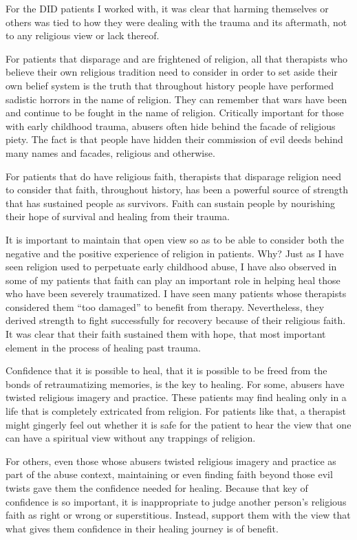 \documentclass[]{book}
\begin{document}
For the DID patients I worked with, it was clear that harming themselves or others was tied to how they were dealing with the trauma and its aftermath, not to any religious view or lack thereof.

For patients that disparage and are frightened of religion, all that therapists who believe their own religious tradition need to consider in order to set aside their own belief system is the truth that throughout history people have performed sadistic horrors in the name of religion. They can remember that wars have been and continue to be fought in the name of religion. Critically important for those with early childhood trauma, abusers often hide behind the facade of religious piety. The fact is that people have hidden their commission of evil deeds behind many names and facades, religious and otherwise.

For patients that do have religious faith, therapists that disparage religion need to consider that faith, throughout history, has been a powerful source of strength that has sustained people as survivors. Faith can sustain people by nourishing their hope of survival and healing from their trauma.

It is important to maintain that open view so as to be able to consider both the negative and the positive experience of religion in patients. Why? Just as I have seen religion used to perpetuate early childhood abuse, I have also observed in some of my patients that faith can play an important role in helping heal those who have been severely traumatized. I have seen many patients whose therapists considered them ``too damaged'' to benefit from therapy. Nevertheless, they derived strength to fight successfully for recovery because of their religious faith. It was clear that their faith sustained them with hope, that most important element in the process of healing past trauma.

Confidence that it is possible to heal, that it is possible to be freed from the bonds of retraumatizing memories, is the key to healing. For some, abusers have twisted religious imagery and practice. These patients may find healing only in a life that is completely extricated from religion. For patients like that, a therapist might gingerly feel out whether it is safe for the patient to hear the view that one can have a spiritual view without any trappings of religion.

For others, even those whose abusers twisted religious imagery and practice as part of the abuse context, maintaining or even finding faith beyond those evil twists gave them the confidence needed for healing. Because that key of confidence is so important, it is inappropriate to judge another person's religious faith as right or wrong or superstitious. Instead, support them with the view that what gives them confidence in their healing journey is of benefit.
\end{document}
